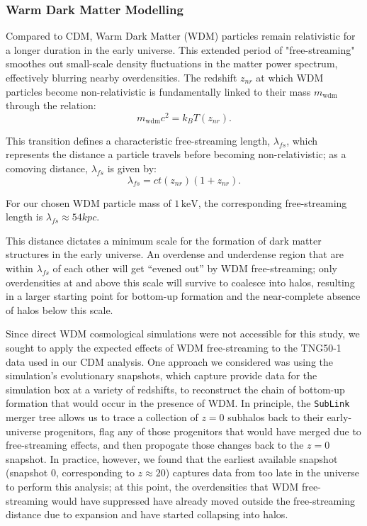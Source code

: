 \documentclass[10pt,onecolumn]{article}
\begin{document}
\subsubsection*{Warm Dark Matter Modelling}

Compared to CDM, Warm Dark Matter (WDM) particles remain relativistic for a longer duration in the early universe. This extended period of "free-streaming" smoothes out small-scale density fluctuations in the matter power spectrum, effectively blurring nearby overdensities. The redshift $z_{nr}$ at which WDM particles become non-relativistic is fundamentally linked to their mass $m_{\text{wdm}}$ through the relation:
\begin{equation}
    m_{\text{wdm}}c^2 = k_B T(z_{nr}).
\end{equation}

This transition defines a characteristic free-streaming length, $\lambda_{fs}$, which represents the distance a particle travels before becoming non-relativistic; as a comoving distance, $\lambda_{fs}$ is given by:
\begin{equation}
    \lambda_{fs} = c t(z_{nr})(1 + z_{nr}).
\end{equation}

For our chosen WDM particle mass of $1\,\text{keV}$, the corresponding free-streaming length is $\lambda_{fs} \approx 54 kpc$.

This distance dictates a minimum scale for the formation of dark matter structures in the early universe. An overdense and underdense region that are within  $\lambda_{fs}$ of each other will get ``evened out'' by WDM free-streaming; only overdensities at and above this scale will survive to coalesce into halos, resulting in a larger starting point for bottom-up formation and the near-complete absence of halos below this scale.

Since direct WDM cosmological simulations were not accessible for this study, we sought to apply the expected effects of WDM free-streaming to the TNG50-1 data used in our CDM analysis. One approach we considered was using the simulation's evolutionary snapshots, which capture provide data for the simulation box at a variety of redshifts, to reconstruct the chain of bottom-up formation that would occur in the presence of WDM. In principle, the \texttt{SubLink} merger tree \citep{Rodriguez2015} allows us to trace a collection of $z=0$ subhalos back to their early-universe progenitors, flag any of those progenitors that would have merged due to free-streaming effects, and then propogate those changes back to the $z=0$ snapshot. In practice, however, we found that the earliest available snapshot (snapshot 0, corresponding to $z\approx 20$) captures data from too late in the universe to perform this analysis; at this point, the overdensities that WDM free-streaming would have suppressed have already moved outside the free-streaming distance due to expansion and have started collapsing into halos.
\end{document}
